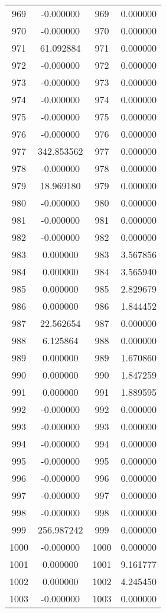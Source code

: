 \documentclass[12pt]{article}
\begin{document}
\begin{longtable}{@{}cccc@{}}
969 & -0.000000 & 969 & 0.000000 \\
970 & -0.000000 & 970 & 0.000000 \\
971 & 61.092884 & 971 & 0.000000 \\
972 & -0.000000 & 972 & 0.000000 \\
973 & -0.000000 & 973 & 0.000000 \\
974 & -0.000000 & 974 & 0.000000 \\
975 & -0.000000 & 975 & 0.000000 \\
976 & -0.000000 & 976 & 0.000000 \\
977 & 342.853562 & 977 & 0.000000 \\
978 & -0.000000 & 978 & 0.000000 \\
979 & 18.969180 & 979 & 0.000000 \\
980 & -0.000000 & 980 & 0.000000 \\
981 & -0.000000 & 981 & 0.000000 \\
982 & -0.000000 & 982 & 0.000000 \\
983 & 0.000000 & 983 & 3.567856 \\
984 & 0.000000 & 984 & 3.565940 \\
985 & 0.000000 & 985 & 2.829679 \\
986 & 0.000000 & 986 & 1.844452 \\
987 & 22.562654 & 987 & 0.000000 \\
988 & 6.125864 & 988 & 0.000000 \\
989 & 0.000000 & 989 & 1.670860 \\
990 & 0.000000 & 990 & 1.847259 \\
991 & 0.000000 & 991 & 1.889595 \\
992 & -0.000000 & 992 & 0.000000 \\
993 & -0.000000 & 993 & 0.000000 \\
994 & -0.000000 & 994 & 0.000000 \\
995 & -0.000000 & 995 & 0.000000 \\
996 & -0.000000 & 996 & 0.000000 \\
997 & -0.000000 & 997 & 0.000000 \\
998 & -0.000000 & 998 & 0.000000 \\
999 & 256.987242 & 999 & 0.000000 \\
1000 & -0.000000 & 1000 & 0.000000 \\
1001 & 0.000000 & 1001 & 9.161777 \\
1002 & 0.000000 & 1002 & 4.245450 \\
1003 & -0.000000 & 1003 & 0.000000 \\

\end{longtable}
\end{document}
